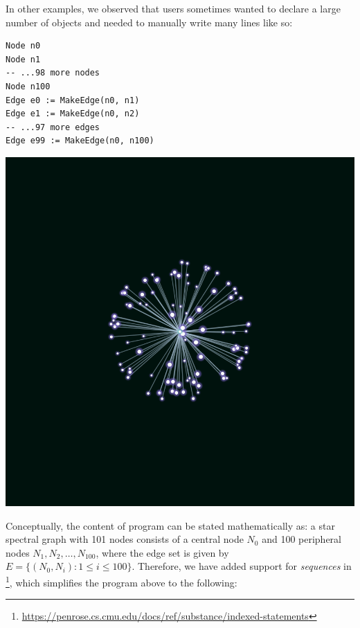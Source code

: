 In other examples, we observed that \Substance{} users sometimes wanted to declare a large number of objects and needed to manually write many lines like so:

\vspace{1em}
\begin{minipage}{.45\linewidth}
\begin{mdframed}[style=SUBCode]
\begin{lstlisting}[language=Sub-graph,escapechar=@]
Node n0
Node n1
-- ...98 more nodes
Node n100
Edge e0 := MakeEdge(n0, n1)
Edge e1 := MakeEdge(n0, n2)
-- ...97 more edges
Edge e99 := MakeEdge(n0, n100)
\end{lstlisting}
\end{mdframed}
\end{minipage}\hfill
\begin{minipage}{.45\linewidth}
   \includegraphics[width=\linewidth]{assets/penrose/star-graph.png} 
\end{minipage}
\vspace{1em}

Conceptually, the content of \Substance{} program can be stated mathematically as: a star spectral graph with 101 nodes consists of a central node \( N_0 \) and 100 peripheral nodes \( N_1, N_2, \dots, N_{100} \), where the edge set is given by \( E = \{(N_0, N_i) : 1 \leq i \leq 100\} \). Therefore, we have added support for \emph{sequences} in \Substance{}\footnote{\url{https://penrose.cs.cmu.edu/docs/ref/substance/indexed-statements}}, which simplifies the program above to the following:

